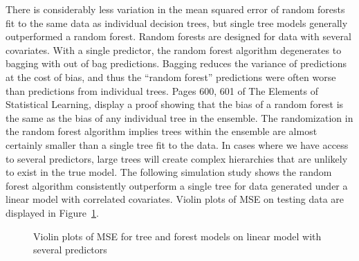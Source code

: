 \documentclass[
  12pt,
  letterpaper,
  DIV=11,
  numbers=noendperiod]{scrartcl}
\begin{document}
There is considerably less variation in the mean squared error of random
forests fit to the same data as individual decision trees, but single
tree models generally outperformed a random forest. Random forests are
designed for data with several covariates. With a single predictor, the
random forest algorithm degenerates to bagging with out of bag
predictions. Bagging reduces the variance of predictions at the cost of
bias, and thus the ``random forest'' predictions were often worse than
predictions from individual trees. Pages 600, 601 of The Elements of
Statistical Learning, \cite{esl} display a proof showing that the bias
of a random forest is the same as the bias of any individual tree in the
ensemble. The randomization in the random forest algorithm implies trees
within the ensemble are almost certainly smaller than a single tree fit
to the data. In cases where we have access to several predictors, large
trees will create complex hierarchies that are unlikely to exist in the
true model. The following simulation study shows the random forest
algorithm consistently outperform a single tree for data generated under
a linear model with correlated covariates. Violin plots of MSE on
testing data are displayed in Figure~\ref{fig-sim2}.

\begin{figure}[H]


\caption{\label{fig-sim2}Violin plots of MSE for tree and forest models
on linear model with several predictors}

\end{figure}%
\end{document}
